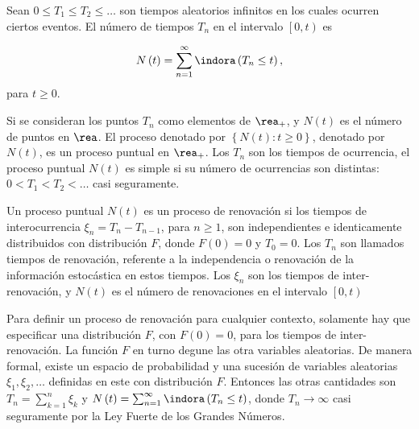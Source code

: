 \begin{Def}\label{Def.Tn}
Sean $0\leq T_{1}\leq T_{2}\leq \ldots$ son tiempos aleatorios infinitos en los cuales ocurren ciertos eventos. El n\'umero de tiempos $T_{n}$ en el intervalo $\left[0,t\right)$ es

\begin{eqnarray}
N\left(t\right)=\sum_{n=1}^{\infty}\indora\left(T_{n}\leq t\right),
\end{eqnarray}
para $t\geq0$.
\end{Def}

Si se consideran los puntos $T_{n}$ como elementos de $\rea_{+}$, y $N\left(t\right)$ es el n\'umero de puntos en $\rea$. El proceso denotado por $\left\{N\left(t\right):t\geq0\right\}$, denotado por $N\left(t\right)$, es un proceso puntual en $\rea_{+}$. Los $T_{n}$ son los tiempos de ocurrencia, el proceso puntual $N\left(t\right)$ es simple si su n\'umero de ocurrencias son distintas: $0<T_{1}<T_{2}<\ldots$ casi seguramente.

\begin{Def}
Un proceso puntual $N\left(t\right)$ es un proceso de renovaci\'on si los tiempos de interocurrencia $\xi_{n}=T_{n}-T_{n-1}$, para $n\geq1$, son independientes e identicamente distribuidos con distribuci\'on $F$, donde $F\left(0\right)=0$ y $T_{0}=0$. Los $T_{n}$ son llamados tiempos de renovaci\'on, referente a la independencia o renovaci\'on de la informaci\'on estoc\'astica en estos tiempos. Los $\xi_{n}$ son los tiempos de inter-renovaci\'on, y $N\left(t\right)$ es el n\'umero de renovaciones en el intervalo $\left[0,t\right)$
\end{Def}


\begin{Note}
Para definir un proceso de renovaci\'on para cualquier contexto, solamente hay que especificar una distribuci\'on $F$, con $F\left(0\right)=0$, para los tiempos de inter-renovaci\'on. La funci\'on $F$ en turno degune las otra variables aleatorias. De manera formal, existe un espacio de probabilidad y una sucesi\'on de variables aleatorias $\xi_{1},\xi_{2},\ldots$ definidas en este con distribuci\'on $F$. Entonces las otras cantidades son $T_{n}=\sum_{k=1}^{n}\xi_{k}$ y $N\left(t\right)=\sum_{n=1}^{\infty}\indora\left(T_{n}\leq t\right)$, donde $T_{n}\rightarrow\infty$ casi seguramente por la Ley Fuerte de los Grandes N\'umeros.
\end{Note}







